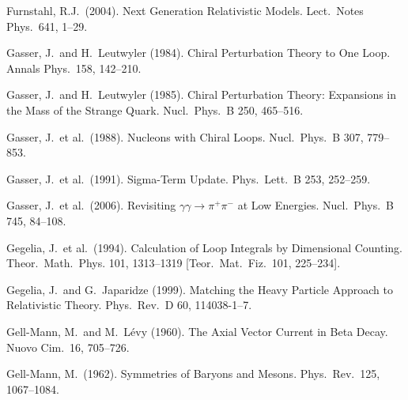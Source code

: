 \documentclass[twoside,12pt]{article}
\begin{document}
\begin{thebibliography}{}
Furnstahl, R.J.~(2004).
Next Generation Relativistic Models.
Lect.\ Notes Phys.\  641, 1--29.


Gasser, J.~and H.~Leutwyler (1984).
Chiral Perturbation Theory to One Loop.
Annals Phys.\ 158, 142--210.

Gasser, J.~and H.~Leutwyler (1985).
Chiral Perturbation Theory: Expansions in the Mass of the Strange Quark.
Nucl.\ Phys.\  B 250, 465--516.

Gasser, J.~et al.~(1988).
Nucleons with Chiral Loops.
Nucl.\ Phys.\  B 307, 779--853.

Gasser, J.~et al.~(1991).
Sigma-Term Update.
Phys.\ Lett.\  B 253, 252--259.

Gasser, J.~et al.~(2006).
Revisiting $\gamma \gamma \to \pi^+ \pi^-$  at Low Energies.
Nucl.\ Phys.\  B 745, 84--108.

Gegelia, J.~et al.~(1994).
Calculation of Loop Integrals by Dimensional Counting.
Theor.\ Math.\ Phys. 101, 1313--1319
[Teor.\ Mat.\ Fiz.\  101, 225--234].

Gegelia, J.~and G.~Japaridze (1999).
Matching the Heavy Particle Approach to Relativistic Theory.
Phys.\ Rev.\  D 60, 114038-1--7.

Gell-Mann, M.~and M.~L{\'e}vy (1960).
The Axial Vector Current in Beta Decay.
Nuovo Cim.\ 16, 705--726.

Gell-Mann, M.~(1962).
Symmetries of Baryons and Mesons.
Phys.\ Rev.\  125, 1067--1084.


\end{thebibliography}
\end{document}
